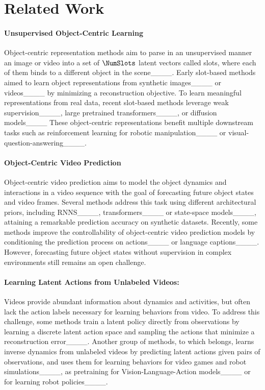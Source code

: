\section{Related Work}
\paragraph{Unsupervised Object-Centric Learning}
%
Object-centric representation methods aim to parse in an unsupervised manner an image or video into a set of $\NumSlots$ latent vectors called slots, where each of them binds to a different object in the scene____.
%
Early slot-based methods aimed to learn object representations from synthetic images____ or videos____ by minimizing a reconstruction objective.
%
To learn meaningful representations from real data, recent slot-based methods leverage weak supervision____, large pretrained transformers____, or diffusion models____
%
These object-centric representations benefit multiple downstream tasks such as reinforcement learning for robotic manipulation____ or visual-question-answering____.




\paragraph{Object-Centric Video Prediction}

Object-centric video prediction aims to model the object dynamics and interactions in a video sequence with the goal of forecasting future object states and video frames.
%
Several methods address this task using different architectural priors, including RNNS____, transformers____ or state-space models____, attaining a remarkable prediction accuracy on synthetic datasets.
%
Recently, some methods improve the controllability of object-centric video prediction models by conditioning the prediction process on actions____ or language captions____.
%
However, forecasting future object states without supervision in complex environments still remains an open challenge.









\paragraph{Learning Latent Actions from Unlabeled Videos:}
%

Videos provide abundant information about dynamics and activities, but often lack the action labels necessary for learning behaviors from video.
%
To address this challenge, some methods train a latent policy directly from observations by learning a discrete latent action space and sampling the actions that minimize a reconstruction error____.
%
Another group of methods, to which \Method{} belongs, learns inverse dynamics from unlabeled videos by predicting latent actions given pairs of observations, and uses them for learning behaviors for video games and robot simulations____, as pretraining for Vision-Language-Action models____ or for learning robot policies____.
%

